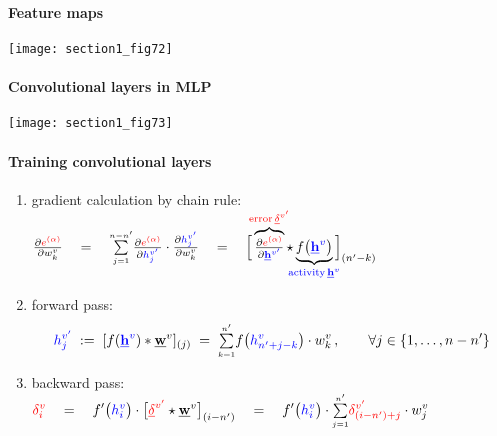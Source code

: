 \paragraph{Feature maps}
	\begin{center}
		\texttt{[image: section1\_fig72]}
	\end{center}
	\vspace{-2mm}

\paragraph{Convolutional layers in MLP}
\begin{center}
		\texttt{[image: section1\_fig73]}
	\end{center}
	\vspace{-2mm}
	\vspace{-1mm}
\paragraph{Training convolutional layers}
	\begin{enumerate}			
\item gradient calculation by chain rule:\\[-2mm]
			$\displaystyle 
				\smallfrac{\partial {\color{red}e^{(\alpha)}}}
					{\partial w_{k}^{v}}
				\quad=\quad 
					\smallsum{j=1}{n-n'}
					\smallfrac{\partial{\color{red} e^{(\alpha)}}}
						{\partial {\color{blue}h_j^{v'}}}
					\cdot \smallfrac{\partial {\color{blue}h_j^{v'}}}
						{\partial w_{k}^{v}}
				\quad=\quad
					\Big[ \overbrace{ 
						\smallfrac{\partial {\color{red}e^{(\alpha)}}}%
						{\partial {\color{blue}\vec h^{v'}}} 
					}^{\kern-2ex{\color{red}\text{error}\,\vec \delta^{v'}}\kern-2ex} 
					\star \underbrace{
						f\big({\color{blue}\vec h^{v}}\big)
					}_{\kern-2ex\color{blue}\text{activity}\,\vec h^v\kern-2ex} 
					\Big]_{(n'-k)}
			$	
		\item forward pass:
			$$
				{\color{blue}h_j^{v'}}
				\;:=\; [ f({\color{blue}\underline{\mathbf{h}}^v}) * \underline{\mathbf{w}}^{v} ]_{(j)}
				\;=\; {\textstyle \sum\limits_{\scriptscriptstyle k=1}^{\scriptscriptstyle n'}} f\big({\color{blue}h^{v}_{n'+j-k}}\big) 
					\cdot w_k^v  \,,
				\qquad \forall j \in \{1, \ldots, n-n'\}
			$$	
		\vspace{0mm}	
		\item backward pass: \\[3mm]
			$\displaystyle 
				{\color{red}\delta_i^{v}}
				\quad=\quad 
					f'\big( {\color{blue}h_i^{v}} \big) \cdot
					\big[ {\color{red}\underline{\mathbf{\delta}}^{v'}} \star \underline{\mathbf{w}}^{v} 
					\big]_{(i-n')}
				\quad=\quad 
					f'\big( {\color{blue}h_i^{v}} \big) \cdot
					{\textstyle \sum\limits_{\scriptscriptstyle j=1}^{\scriptscriptstyle n'}}
					{\color{red} \delta_{(i-n')+j}^{v'} }
					\cdot w_j^v  
			$
	\end{enumerate}			
